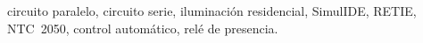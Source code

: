 \documentclass[conference]{IEEEtran}
\begin{document}
\begin{IEEEkeywords}
  circuito paralelo, circuito serie, iluminación residencial, SimulIDE, RETIE, NTC~2050, control automático, relé de presencia.
\end{IEEEkeywords}



\nocite{*}


\end{document}
